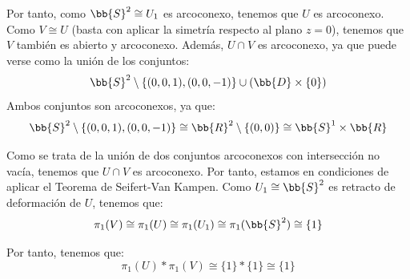 \begin{ejercicio}
\begin{enumerate}[label=\alph*)]
\begin{figure}[H]
            \end{figure}

            Por tanto, como $\bb{S}^2\cong U_1$ es arcoconexo, tenemos que $U$ es arcoconexo. Como $V\cong U$ (basta con aplicar la simetría respecto al plano $z=0$), tenemos que $V$ también es abierto y arcoconexo. Además, $U\cap V$ es arcoconexo, ya que puede verse como la unión de los conjuntos:
            \begin{equation*}
                \bb{S}^2\setminus \{(0,0,1),(0,0,-1)\} \cup (\bb{D}\times \{0\})
            \end{equation*}
            Ambos conjuntos son arcoconexos, ya que:
            \begin{equation*}
                \bb{S}^2\setminus \{(0,0,1),(0,0,-1)\} \cong \bb{R}^2\setminus \{(0,0)\} \cong \bb{S}^1 \times \bb{R}
            \end{equation*}
            
            Como se trata de la unión de dos conjuntos arcoconexos con intersección no vacía, tenemos que $U\cap V$ es arcoconexo. Por tanto, estamos en condiciones de aplicar el Teorema de Seifert-Van Kampen. Como $U_1\cong \bb{S}^2$ es retracto de deformación de $U$, tenemos que:
            \begin{equation*}
                \pi_1(V) \cong \pi_1(U) \cong \pi_1(U_1) \cong \pi_1(\bb{S}^2)\cong \{1\}
            \end{equation*}

            Por tanto, tenemos que:
            \begin{equation*}
                \pi_1(U)\ast \pi_1(V) \cong \{1\}\ast \{1\} \cong \{1\}
            \end{equation*}


\end{enumerate}
\end{ejercicio}

